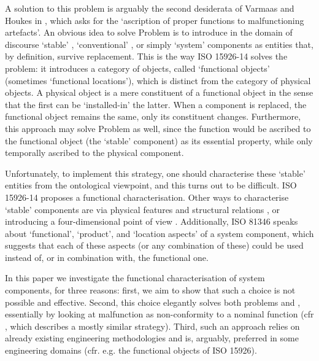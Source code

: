 \documentclass[
]{ceurart}
\begin{document}
\eflist 
A solution to this problem is arguably the second desiderata of Varmaas and Houkes in \cite{vermaasAscribingFunctionsTechnical2003}, which asks for the `ascription of proper functions to malfunctioning artefacts'.
An obvious idea to solve Problem  is to introduce in the domain of discourse `stable' \cite{compagnoComparingOntologicalAlternatives2021}, `conventional' \cite{guarinoArtefactualSystemsMissing2014}, or simply `system' \cite{westDevelopingHighQuality2011} components as entities that, by definition, survive replacement.   
This is the way ISO 15926-14 \cite{kluwerISO159261420202020} solves the problem: it introduces a category of objects, called `functional objects' (sometimes `functional locations'), which is distinct from the category of physical objects. A physical object is a mere constituent of a functional object in the sense that the first can be `installed-in' the latter. When a component is replaced, the functional object remains the same, only its constituent changes. Furthermore, this approach may solve Problem  as well, since the function would be ascribed to the functional object (the `stable' component) as its essential property, while only temporally ascribed to the physical component. 

Unfortunately, to implement this strategy, one should characterise these `stable' entities from the ontological viewpoint, and this turns out to be difficult.
ISO 15926-14 proposes a functional characterisation. Other ways to characterise `stable' components are via physical features and structural relations \cite{compagnoComparingOntologicalAlternatives2021}, or introducing a four-dimensional point of view \cite{westDevelopingHighQuality2011}. Additionally, ISO 81346 \cite{ISOIEC8134612009} speaks about `functional', `product', and `location aspects' of a system component, which suggests that each of these aspects (or any combination of these) could be used instead of, or in combination with, the functional one.

In this paper we investigate the functional characterisation of system components, for three reasons: first, we aim to show that such a choice is not possible and effective. Second, this choice elegantly solves both problems  and , essentially by looking at malfunction as non-conformity to a nominal function (cfr \cite{mizoguchiUnifyingDefinitionArtifact2016}, which describes a mostly similar strategy). Third, such an approach relies on already existing engineering methodologies and is, arguably, preferred in some engineering domains (cfr. e.g. the functional objects of ISO 15926).
\end{document}
